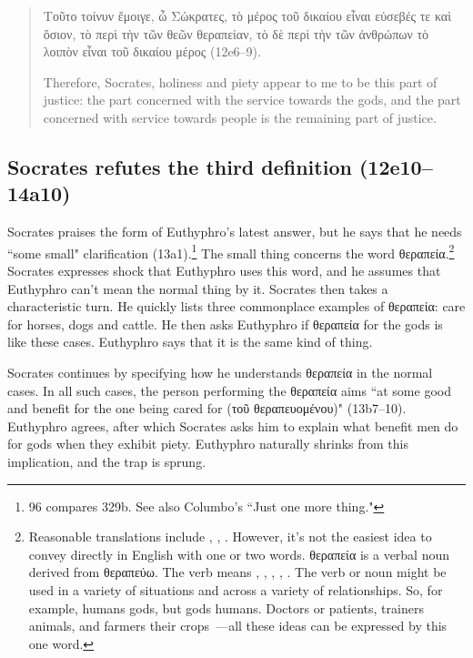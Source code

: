 \documentclass[12pt]{article}
\begin{document}
\begin{quote}

    {\g Τοῦτο τοίνυν ἔμοιγε, ὦ Σώκρατες, τὸ μέρος τοῦ δικαίου εἶναι εὐσεβές τε
    καὶ ὅσιον, τὸ περὶ τὴν τῶν θεῶν θεραπείαν, τὸ δὲ περὶ τὴν τῶν ἀνθρώπων τὸ
    λοιπὸν εἶναι τοῦ δικαίου μέρος} (12e6--9).

    Therefore, Socrates, holiness and piety appear to me to be this part of
    justice: the part concerned with the service towards the gods, and the part
    concerned with service towards people is the remaining part of justice.

\end{quote}

\subsection{Socrates refutes the third definition (12e10--14a10)}

Socrates praises the form of Euthyphro's latest answer, but he says that he
needs ``some small" clarification (13a1).\footnote{\citet{bailly2003} 96
compares  329b.  See also Columbo's ``Just one more thing."}
The small thing concerns the word {\g θεραπεία}.\footnote{Reasonable
translations include , , .  However,
it's not the easiest idea to convey directly in English with one or two words.
{\g θεραπεία} is a verbal noun derived from {\g θεραπεύω}.  The verb means
, , , ,
.  The verb or noun might be used in a variety of
situations and across a variety of relationships.  So, for example, humans
 gods, but gods  humans.  Doctors  or  patients, trainers  animals, and farmers
 their crops~---all these ideas can be expressed by this one
word.}  Socrates expresses shock that Euthyphro uses this word, and he assumes
that Euthyphro can't mean the normal thing by it.  Socrates then takes
a characteristic turn.  He quickly lists three commonplace examples of {\g
θεραπεία}: care for horses, dogs and cattle.  He then asks Euthyphro if
θεραπεία for the gods is like these cases.  Euthyphro says that it is the same
kind of thing.

Socrates continues by specifying how he understands {\g θεραπεία} in the normal
cases.  In all such cases, the person performing the {\g θεραπεία} aims ``at
some good and benefit for the one being cared for ({\g τοῦ θεραπευομένου})"
(13b7--10).  Euthyphro agrees, after which Socrates asks him to explain what
benefit men do for gods when they exhibit piety.  Euthyphro naturally shrinks
from this implication, and the trap is sprung.
\end{document}
